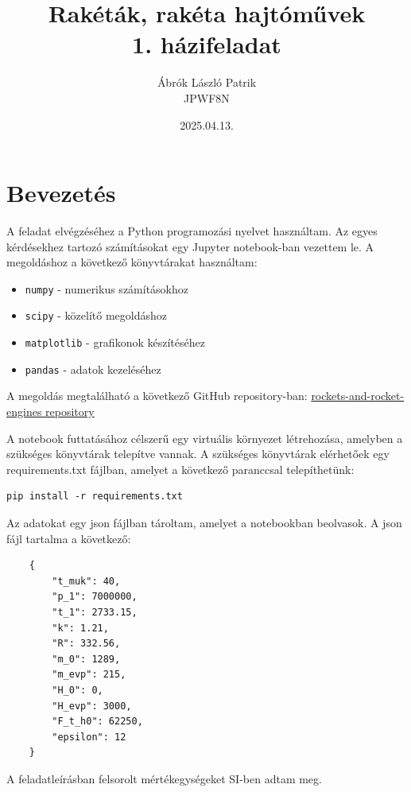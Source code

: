 \documentclass[a4paper,12pt]{article}
\title{Rakéták, rakéta hajtóművek\\ 1. házifeladat}
\author{Ábrók László Patrik\\ JPWF8N}
\date{2025.04.13.} %
\begin{document}
\maketitle
\newpage



\section{Bevezetés}
A feladat elvégzéséhez a Python programozási nyelvet használtam. Az egyes kérdésekhez tartozó számításokat egy Jupyter notebook-ban vezettem le.
A megoldáshoz a következő könyvtárakat használtam:
\begin{itemize}
    \item \texttt{numpy} - numerikus számításokhoz
    \item \texttt{scipy} - közelítő megoldáshoz
    \item \texttt{matplotlib} - grafikonok készítéséhez
    \item \texttt{pandas} - adatok kezeléséhez
\end{itemize}
A megoldás megtalálható a következő GitHub repository-ban:
\href{https://github.com/LaszloAbrok/rockets-and-rocket-engines}{rockets-and-rocket-engines repository}

A notebook futtatásához célszerű egy virtuális környezet létrehozása, amelyben a szükséges könyvtárak telepítve vannak.
A szükséges könyvtárak elérhetőek egy requirements.txt fájlban, amelyet a következő paranccsal telepíthetünk:
\begin{verbatim}
pip install -r requirements.txt
\end{verbatim}

Az adatokat egy json fájlban tároltam, amelyet a notebookban beolvasok. A json fájl tartalma a következő:
\begin{verbatim}
    {
        "t_muk": 40,
        "p_1": 7000000,
        "t_1": 2733.15,
        "k": 1.21,
        "R": 332.56,
        "m_0": 1289,
        "m_evp": 215,
        "H_0": 0,
        "H_evp": 3000,
        "F_t_h0": 62250,
        "epsilon": 12
    }
\end{verbatim}

A feladatleírásban felsorolt mértékegységeket SI-ben adtam meg.
\end{document}
